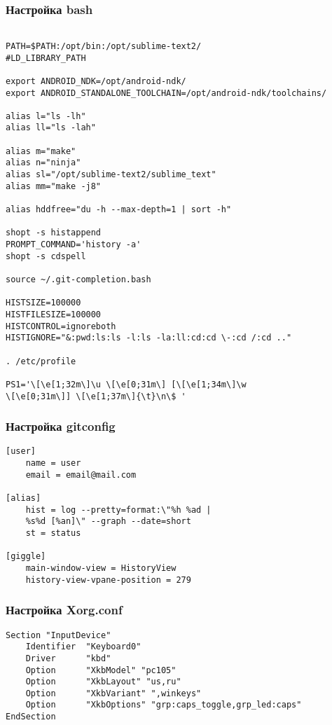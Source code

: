 \documentclass[10pt, a4paper]{article}
\begin{document}
\subsubsection{Настройка bash}
\begin{verbatim}

PATH=$PATH:/opt/bin:/opt/sublime-text2/
#LD_LIBRARY_PATH

export ANDROID_NDK=/opt/android-ndk/
export ANDROID_STANDALONE_TOOLCHAIN=/opt/android-ndk/toolchains/

alias l="ls -lh"
alias ll="ls -lah"

alias m="make"
alias n="ninja"
alias sl="/opt/sublime-text2/sublime_text"
alias mm="make -j8"

alias hddfree="du -h --max-depth=1 | sort -h"

shopt -s histappend
PROMPT_COMMAND='history -a'
shopt -s cdspell

source ~/.git-completion.bash

HISTSIZE=100000
HISTFILESIZE=100000
HISTCONTROL=ignoreboth
HISTIGNORE="&:pwd:ls:ls -l:ls -la:ll:cd:cd \-:cd /:cd .."

. /etc/profile

PS1='\[\e[1;32m\]\u \[\e[0;31m\] [\[\e[1;34m\]\w 
\[\e[0;31m\]] \[\e[1;37m\]{\t}\n\$ '

\end{verbatim}

\subsubsection{Настройка gitconfig}
\begin{verbatim}
[user]
    name = user
    email = email@mail.com

[alias]
    hist = log --pretty=format:\"%h %ad | 
    %s%d [%an]\" --graph --date=short
    st = status

[giggle]
    main-window-view = HistoryView
    history-view-vpane-position = 279
\end{verbatim}

\subsubsection{Настройка Xorg.conf}
\begin{verbatim}
Section "InputDevice"
    Identifier  "Keyboard0"
    Driver      "kbd"
    Option      "XkbModel" "pc105"
    Option      "XkbLayout" "us,ru"
    Option      "XkbVariant" ",winkeys"
    Option      "XkbOptions" "grp:caps_toggle,grp_led:caps"
EndSection
\end{verbatim}
\end{document}
